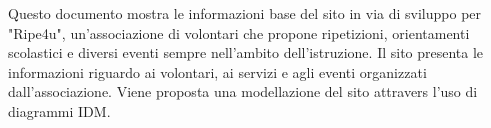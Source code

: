     Questo documento mostra le informazioni base del sito in via di sviluppo per
    "Ripe4u", un'associazione di volontari che propone ripetizioni, orientamenti
    scolastici e diversi eventi sempre nell'ambito dell'istruzione. Il sito
    presenta le informazioni riguardo ai volontari, ai servizi e agli eventi
    organizzati dall'associazione.
    Viene proposta una modellazione del sito attravers l'uso di diagrammi IDM.
     